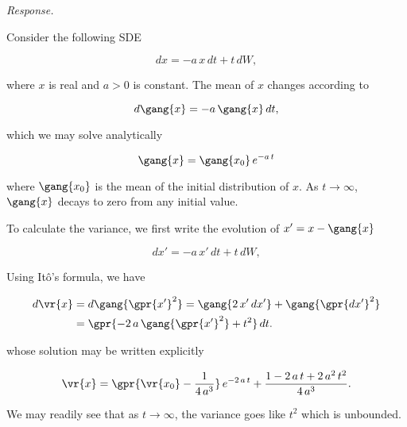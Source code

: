 \textit{Response.}

Consider the following SDE

\begin{equation}
	dx = -a\,x\,dt + t\,dW,
\end{equation}

where $x$ is real and $a >0$ is constant. The mean of $x$ changes according to

\begin{equation}
	d\gang{x} = -a\,\gang{x}\,dt,
\end{equation}

which we may solve analytically

\begin{equation}
	\gang{x} = \gang{x_0}\,e^{-a\,t}
\end{equation}

where $\gang{x_0}$ is the mean of the initial distribution of $x$. As $t \to \infty$, $\gang{x}$ decays to zero from any initial value.

To calculate the variance, we first write the evolution of $x' = x - \gang{x}$

\begin{equation}
	dx' = -a\,x'\,dt + t\,dW,
\end{equation}

Using It\^{o}'s formula, we have

\begin{align}
	d\vr{x} &= d\gang{\gpr{x'}^2} = \gang{2\,x'\,dx'} + \gang{\gpr{dx'}^2} \nonumber \\
		&= \gpr{-2\,a\,\gang{\gpr{x'}^2} + t^2}\,dt.
\end{align}

whose solution may be written explicitly

\begin{equation}
	\vr{x} = \gpr{\vr{x_0} - \frac{1}{4\,a^3}}\,e^{-2\,a\,t} + \frac{1 - 2\,a\,t + 2\,a^2\,t^2}{4\,a^3}.
\end{equation}

We may readily see that as $t \to \infty$, the variance goes like $t^2$ which is unbounded.

